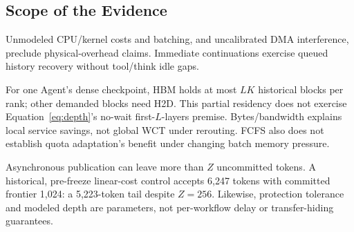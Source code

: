 \subsection{Scope of the Evidence}
\label{sec:eval-limits}
Unmodeled CPU/kernel costs and batching, and uncalibrated DMA interference,
preclude physical-overhead claims. Immediate continuations exercise queued
history recovery without tool/think idle gaps.

For one Agent's dense checkpoint, HBM holds at most $LK$ historical blocks per
rank; other demanded blocks need H2D. This partial residency does not exercise
Equation~\ref{eq:depth}'s no-wait first-$L$-layers premise. Bytes/bandwidth
explains local service savings, not global WCT under rerouting. FCFS also
does not establish quota adaptation's benefit under changing batch memory pressure.

Asynchronous publication can leave more than $Z$ uncommitted tokens.
A historical, pre-freeze linear-cost control accepts 6,247 tokens with
committed frontier 1,024: a 5,223-token tail despite $Z=256$.
Likewise, protection tolerance and modeled depth are parameters, not
per-workflow delay or transfer-hiding guarantees.
